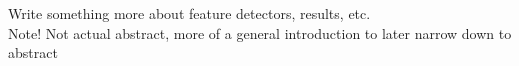 Write something more about feature detectors, results, etc. \\
Note! Not actual abstract, more of a general introduction to later narrow down to abstract


\begin{comment}
- Peer-review process \\
- Duplicates \\
- Bias \\
- Code examples (or lack thereof) \\
- Easier to spot bad questions \\
- Homework is not accepted \\
\end{comment}

\hypersetup{pageanchor=false}